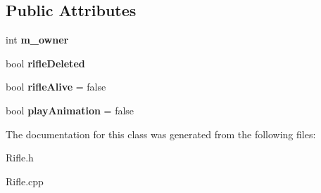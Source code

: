\subsection*{Public Attributes}
\begin{DoxyCompactItemize}
\item 
int {\bfseries m\+\_\+owner}\hypertarget{class_rifle_a98d5ec3132c17937bd838275c7ee174e}{}\label{class_rifle_a98d5ec3132c17937bd838275c7ee174e}

\item 
bool {\bfseries rifle\+Deleted}\hypertarget{class_rifle_acce82420ee517a34bb8fb9cd4fd08c6a}{}\label{class_rifle_acce82420ee517a34bb8fb9cd4fd08c6a}

\item 
bool {\bfseries rifle\+Alive} = false\hypertarget{class_rifle_a251aecd80bd7ce87a71d305e430dd113}{}\label{class_rifle_a251aecd80bd7ce87a71d305e430dd113}

\item 
bool {\bfseries play\+Animation} = false\hypertarget{class_rifle_a12d120748d5b51fe8a0c2318691e364b}{}\label{class_rifle_a12d120748d5b51fe8a0c2318691e364b}

\end{DoxyCompactItemize}


The documentation for this class was generated from the following files\+:\begin{DoxyCompactItemize}
\item 
Rifle.\+h\item 
Rifle.\+cpp\end{DoxyCompactItemize}
